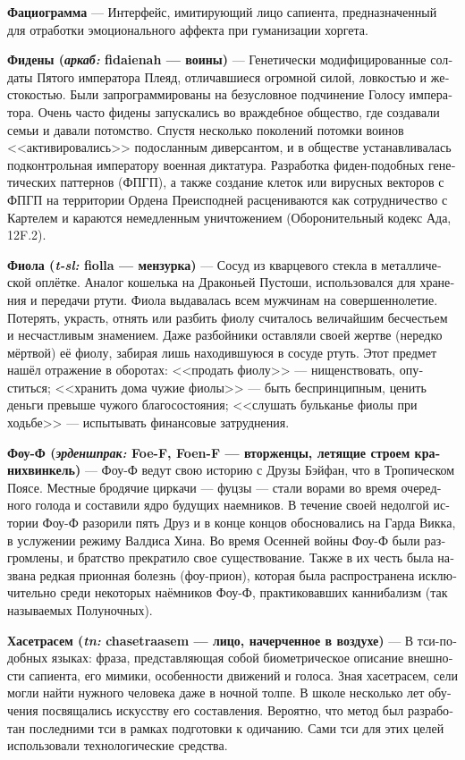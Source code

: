 \documentclass[a4paper,12pt,fleqn]{book}\usepackage{cooltooltips}\usepackage{polyglossia}\setdefaultlanguage[babelshorthands=true]{russian}\setotherlanguage{english}\defaultfontfeatures{Ligatures=TeX,Mapping=tex-text} \usepackage{xcolor}\definecolor{lightgray}{HTML}{bbbbbb}\color{lightgray}\newcommand{\ml}[3]{\textenglish{\textcolor{black}{#3}}}
\newcommand{\theterm}[3]{\textbf{\hypertarget{#1}{#2}} --- #3}
\newcommand{\theorigin}[3]{\textit{#1:} #2 --- #3}
\begin{document}
{\theterm{faciogramm}
{Фациограмма}
{Интерфейс, имитирующий лицо сапиента, предназначенный для отработки эмоционального аффекта при гуманизации хоргета.}

\theterm{fidens}
{Фидены (\theorigin{аркаб}{fidaienah}{воины})}
{Генетически модифицированные солдаты Пятого императора Плеяд, отличавшиеся огромной силой, ловкостью и жестокостью.
Были запрограммированы на безусловное подчинение Голосу императора.
Очень часто фидены запускались во враждебное общество, где создавали семьи и давали потомство.
Спустя несколько поколений потомки воинов <<активировались>> подосланным диверсантом, и в обществе устанавливалась подконтрольная императору военная диктатура.
Разработка фиден-подобных генетических паттернов (ФПГП), а также создание клеток или вирусных векторов с ФПГП на территории Ордена Преисподней расцениваются как сотрудничество с Картелем и караются немедленным уничтожением (Оборонительный кодекс Ада, 12F.2).}

\theterm{viola}
{Фиола (\theorigin{t-sl}{fiolla}{мензурка})}
{Сосуд из кварцевого стекла в металлической оплётке.
Аналог кошелька на Драконьей Пустоши, использовался для хранения и передачи ртути.
Фиола выдавалась всем мужчинам на совершеннолетие.
Потерять, украсть, отнять или разбить фиолу считалось величайшим бесчестьем и несчастливым знамением.
Даже разбойники оставляли своей жертве (нередко мёртвой) её фиолу, забирая лишь находившуюся в сосуде ртуть.
Этот предмет нашёл отражение в оборотах: <<продать фиолу>> --- нищенствовать, опуститься;
<<хранить дома чужие фиолы>> --- быть беспринципным, ценить деньги превыше чужого благосостояния;
<<слушать бульканье фиолы при ходьбе>> --- испытывать финансовые затруднения.}

\theterm{foe-f}
{Фоу-Ф (\theorigin{эрденшпрак}{Foe-F, Foen-F}{вторженцы, летящие строем кранихвинкель})}
{Фоу-Ф ведут свою историю с Друзы Бэйфан, что в Тропическом Поясе.
Местные бродячие циркачи --- фуцзы --- стали ворами во время очередного голода и составили ядро будущих наемников.
В течение своей недолгой истории Фоу-Ф разорили пять Друз и в конце концов обосновались на Гарда Викка, в услужении режиму Валдиса Хина.
Во время Осенней войны Фоу-Ф были разгромлены, и братство прекратило свое существование.
Также в их честь была названа редкая прионная болезнь (фоу-прион), которая была распространена исключительно среди некоторых наёмников Фоу-Ф, практиковавших каннибализм (так называемых Полуночных).
}

\theterm{chasetraasem}
{Хасетрасем (\theorigin{tn}{chasetraasem}{лицо, начерченное в воздухе})}
{В тси-подобных языках: фраза, представляющая собой биометрическое описание внешности сапиента, его мимики, особенности движений и голоса.
Зная хасетрасем, сели могли найти нужного человека даже в ночной толпе.
В школе несколько лет обучения посвящались искусству его составления.
Вероятно, что метод был разработан последними тси в рамках подготовки к одичанию.
Сами тси для этих целей использовали технологические средства.}

}
\end{document}
